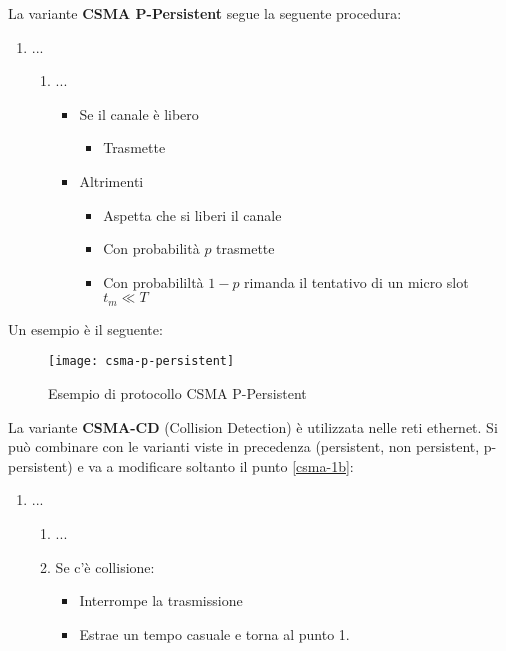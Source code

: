 \documentclass[a4paper]{article}
\begin{document}
\vspace{1em}
\noindent
La variante \textbf{CSMA P-Persistent} segue la seguente procedura:
\begin{enumerate}
  \item ...
    
    \begin{enumerate}
      \item ...
        \begin{itemize}
          \item Se il canale è libero
            \begin{itemize}
              \item Trasmette
            \end{itemize}

          \item Altrimenti
            \begin{itemize}
              \item Aspetta che si liberi il canale
              \item Con probabilità \( p \) trasmette
              \item Con probabililtà \( 1 - p \) rimanda il tentativo di un micro slot \( t_m \ll T \) 
            \end{itemize}
        \end{itemize}
    \end{enumerate}
\end{enumerate}
\begin{example}
  Un esempio è il seguente:
  \begin{figure}[H]
    \centering
    \texttt{[image: csma-p-persistent]}
    \caption{Esempio di protocollo CSMA P-Persistent}
  \end{figure}
\end{example}

\vspace{1em}
\noindent
La variante \textbf{CSMA-CD} (Collision Detection) è utilizzata nelle reti ethernet.
Si può combinare con le varianti viste in precedenza (persistent, non persistent, p-persistent)
e va a modificare soltanto il punto \ref{csma-1b}:
\begin{enumerate}
  \item ...
    \begin{enumerate}
      \item ...
      \item Se c'è collisione:
        \begin{itemize}
          \item Interrompe la trasmissione
          \item Estrae un tempo casuale e torna al punto 1.
        \end{itemize}
    \end{enumerate}
\end{enumerate}
\end{document}

